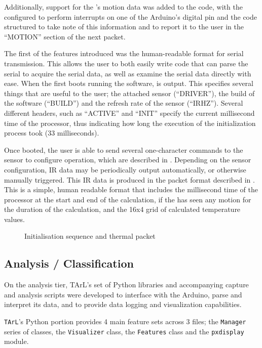 \documentclass[../thesis/thesis.tex]{subfiles}
\begin{document}
Additionally, support for the \pir's motion data was added to the code, with the \pir configured to perform interrupts on one of the Arduino's digital pin and the code structured to take note of this information and to report it to the user in the ``MOTION'' section of the next packet.

The first of the features introduced was the human-readable format for serial transmission. This allows the user to both easily write code that can parse the serial to acquire the serial data, as well as examine the serial data directly with ease. When the \ard first boots running the software,  is output. This specifies several things that are useful to the user; the attached sensor (``DRIVER''), the build of the software (``BUILD'') and the refresh rate of the sensor (``IRHZ''). Several different headers, such as ``ACTIVE'' and ``INIT'' specify the current millisecond time of the processor, thus indicating how long the execution of the initialization process took (33 milliseconds).

Once booted, the user is able to send several one-character commands to the sensor to configure operation, which are described in . Depending on the sensor configuration, IR data may be periodically output automatically, or otherwise manually triggered. This IR data is produced in the packet format described in . This is a simple, human readable format that includes the millisecond time of the processor at the start and end of the calculation, if the \pir has seen any motion for the duration of the calculation, and the 16x4 grid of calculated temperature values.

\begin{figure}
 \centering

\caption{Initialisation sequence and thermal packet}
\label{fig:code:initseq}
\end{figure}

\subsection{Analysis / Classification}

On the analysis tier, TArL's set of Python libraries and accompanying capture and analysis scripts were developed to interface with the Arduino, parse and interpret its data, and to provide data logging and visualization capabilities.

\texttt{TArL}'s Python portion provides 4 main feature sets across 3 files; the \texttt{Manager} series of classes, the \texttt{Visualizer} class, the \texttt{Features} class and the \texttt{pxdisplay} module.
\end{document}
